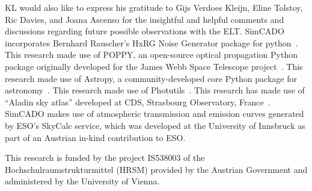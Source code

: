 \documentclass[referee]{aa}
\begin{document}



\begin{acknowledgements}

KL would also like to express his gratitude to Gijs Verdoes Kleijn, Eline Tolstoy, Ric Davies, and Joana Ascenso for the insightful and helpful comments and discussions regarding future possible observations with the ELT\@.
SimCADO incorporates Bernhard Rauscher's HxRG Noise Generator package for python~\citep{nghxrg}.
This research made use of POPPY, an open-source optical propagation Python package originally developed for the James Webb Space Telescope project~\citep{poppy}.
This research made use of Astropy, a community-developed core Python package for astronomy~\citep{astropy, astropy2}.
This research made use of Photutils~\citep{photutils}.
This research has made use of ``Aladin sky atlas'' developed at CDS, Strasbourg Observatory, France~\citep{aladin, aladinlite}.
SimCADO makes use of atmospheric transmission and emission curves generated by ESO's SkyCalc service, which was developed at the University of Innsbruck as part of an Austrian in-kind contribution to ESO\@.

This research is funded by the project IS538003 of the Hochschulraumstrukturmittel (HRSM) provided by the Austrian Government and administered by the University of Vienna.

\end{acknowledgements}








\end{document}
